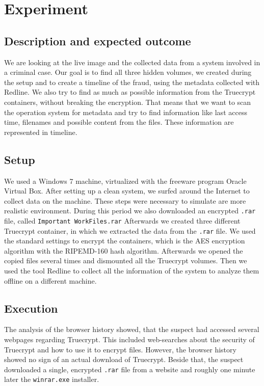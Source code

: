 \section{Experiment}
\subsection{Description and expected outcome}
We are looking at the live image and the collected data from a system involved in a criminal case. Our goal is to find all three hidden volumes, we created during the setup and to create a timeline of the fraud, using the metadata collected with Redline. 
We also try to find as much as possible information from the Truecrypt containers, without breaking the encryption. That means that we want to scan the operation system for metadata and try to find information like last access time, filenames and possible content from the files. These information are represented in timeline.

\subsection{Setup}
We used a Windows 7 machine, virtualized with the freeware program Oracle Virtual Box. After setting up a clean system, we surfed around the Internet to collect data on the machine. 
These steps were necessary to simulate are more realistic environment.
During this period we also downloaded an encrypted \texttt{.rar} file, called \texttt{Important WorkFiles.rar} Afterwards we created three different Truecrypt container, in which we extracted the data from the \texttt{.rar} file.
We used the standard settings to encrypt the containers, which is the AES encryption algorithm with the RIPEMD-160 hash algorithm.
Afterwards we opened the copied files several times and dismounted all the Truecrypt volumes.
Then we used the tool Redline to collect all the information of the system to analyze them offline on a different machine.

\subsection{Execution}
The analysis of the browser history showed, that the suspect had accessed several webpages regarding Truecrypt. This included web-searches about the security of Truecrypt and how to use it to encrypt files. However, the browser history showed no sign of an actual download of Truecrypt. Beside that, the suspect downloaded a single, encrypted \texttt{.rar} file from a website and roughly one minute later the \texttt{winrar.exe} installer.

